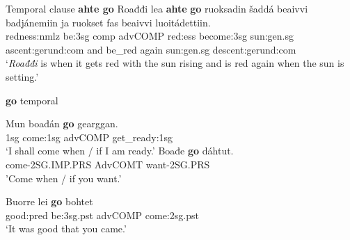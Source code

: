 \documentclass[a4,12pt]{scrartcl}
\begin{document}
\begin{exe}
	\ex \label{ahteGo} Temporal clause \textbf{ahte go} \cite[196]{nickel1994}
	\gll Roađđi lea {\bf ahte} {\bf go} ruoksadin šaddá beaivvi badjánemiin ja ruokset fas beaivvi luoitádettiin.\\
	redness:{\sc nmlz} be:{\sc 3sg} {\sc comp} {\sc advCOMP} red:{\sc ess} become:{\sc 3sg} sun:{\sc gen.sg} ascent:{\sc gerund:com} and be\_red again sun:{\sc gen.sg} descent:{\sc gerund:com}\\
	\glt ‘{\it Roađđi} is when it gets red with the sun rising and is red again when the sun is setting.'


\ex \textbf{go} temporal \label{goTemporal}
\begin{xlist}
\ex %
\cite[196]{nickel1994}
\gll 	Mun 	boađán 	{\bf go} 	gearggan.\\
	{\sc 1sg} come:{\sc 1sg} {\sc advCOMP} get\_ready:{\sc 1sg}\\
\glt 	‘I shall come when / if I am ready.’%
%
\ex \label{goContextDisambig} \cite[196–7]{nickel1994}
\gll Boađe {\bf go} dáhtut.\\ %
come-2SG.IMP.PRS AdvCOMT want-2SG.PRS\\
\glt 'Come when / if you want.'
%


\ex %
\cite[436]{nickel1994}%
\gll 	Buorre 	lei 	{\bf go} 	bohtet\\
	good:{\sc pred} be:{\sc 3sg.pst} {\sc advCOMP} come:{\sc 2sg.pst}\\
\glt 	‘It was good that you came.’
\end{xlist}



\end{exe}
\end{document}
